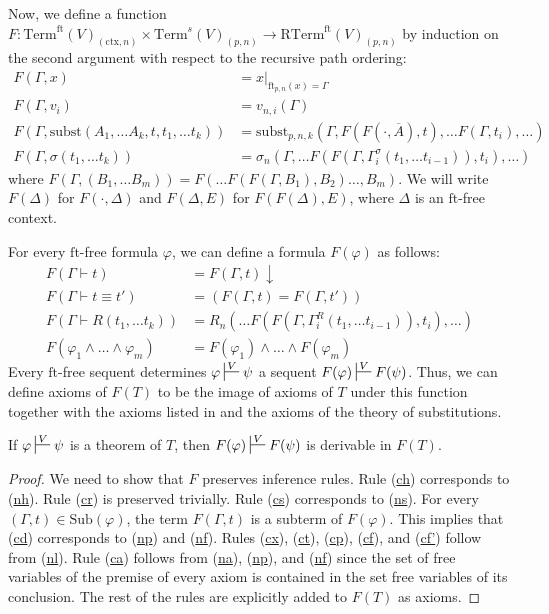 \documentclass[reqno]{amsart}
\newcommand{\axref}[1]{(\hyperref[ax:#1]{#1})}
\theoremstyle{definition}
\theoremstyle{remark}
\newcommand{\fs}[1]{\mathrm{#1}}
\newcommand{\Term}{\fs{Term}}
\newcommand{\RTerm}{\fs{RTerm}}
\newcommand{\subst}{\fs{subst}}
\newcommand{\ft}{\fs{ft}}
\newcommand{\ctx}{\fs{ctx}}
\newcommand{\sub}{\fs{Sub}}
\numberwithin{figure}{section}
\begin{document}
Now, we define a function $F : \Term^\ft(V)_{(\ctx,n)} \times \Term^s(V)_{(p,n)} \to \RTerm^\ft(V)_{(p,n)}$ by induction on the second argument with respect to the recursive path ordering:
\begin{align*}
F(\Gamma, x) & = x|_{\ft_{p,n}(x) = \Gamma} \\
F(\Gamma, v_i) & = v_{n,i}(\Gamma) \\
F(\Gamma, \subst(A_1, \ldots A_k, t, t_1, \ldots t_k)) & = \subst_{p,n,k}(\Gamma, F(F(\cdot,\overline{A}), t), \ldots F(\Gamma, t_i), \ldots) \\
F(\Gamma, \sigma(t_1, \ldots t_k)) & = \sigma_n(\Gamma, \ldots F(F(\Gamma, \Gamma^\sigma_i(t_1, \ldots t_{i-1})), t_i), \ldots)
\end{align*}
where $F(\Gamma, (B_1, \ldots B_m)) = F(\ldots F(F(\Gamma, B_1), B_2) \ldots, B_m)$.
We will write $F(\Delta)$ for $F(\cdot,\Delta)$ and $F(\Delta,E)$ for $F(F(\Delta),E)$, where $\Delta$ is an $\ft$-free context.

For every $\ft$-free formula $\varphi$, we can define a formula $F(\varphi)$ as follows:
\begin{align*}
F(\Gamma \vdash t) & = F(\Gamma,t)\!\downarrow \\
F(\Gamma \vdash t \equiv t') & = (F(\Gamma,t) = F(\Gamma,t')) \\
F(\Gamma \vdash R(t_1, \ldots t_k)) & = R_n(\ldots F(F(\Gamma, \Gamma^R_i(t_1, \ldots t_{i-1})), t_i), \ldots) \\
F(\varphi_1 \land \ldots \land \varphi_m) & = F(\varphi_1) \land \ldots \land F(\varphi_m)
\end{align*}
Every $\ft$-free sequent determines $\varphi \sststile{}{V} \psi$ a sequent $F(\varphi) \sststile{}{V} F(\psi)$.
Thus, we can define axioms of $F(T)$ to be the image of axioms of $T$ under this function together with the axioms listed in  and the axioms of the theory of substitutions.

\begin{lem}[ftmap-th]
If $\varphi \sststile{}{V} \psi$ is a theorem of $T$, then $F(\varphi) \sststile{}{V} F(\psi)$ is derivable in $F(T)$.
\end{lem}
\begin{proof}
We need to show that $F$ preserves inference rules.
Rule \axref{ch} corresponds to \axref{nh}.
Rule \axref{cr} is preserved trivially.
Rule \axref{cs} corresponds to \axref{ns}.
For every $(\Gamma,t) \in \sub(\varphi)$, the term $F(\Gamma,t)$ is a subterm of $F(\varphi)$.
This implies that \axref{cd} corresponds to \axref{np} and \axref{nf}.
Rules \axref{cx}, \axref{ct}, \axref{cp}, \axref{cf}, and \axref{cf'} follow from \axref{nl}.
Rule \axref{ca} follows from \axref{na}, \axref{np}, and \axref{nf} since the set of free variables of the premise of every axiom is contained in the set free variables of its conclusion.
The rest of the rules are explicitly added to $F(T)$ as axioms.
\end{proof}
\end{document}
